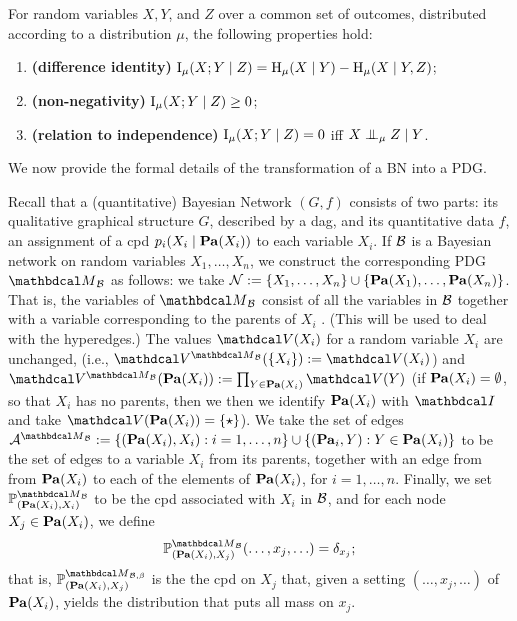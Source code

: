 \begin{subappendices}
\begin{fact}\label{fact:cmi}
For random variables $X,Y$, and $Z$ over a common set of outcomes,
distributed according to a distribution $\mu$,
the following properties hold:
\begin{enumerate}
    \item \textbf{(difference identity)} $\operatorname{\mathrm{I}}_\mu(X ; Y \mid Z) =
                  \operatorname{\mathrm{H}}_\mu(X \mid Y) - \operatorname{\mathrm{H}}_\mu(X \mid Y, Z)$; 
   \item \textbf{(non-negativity)} $\operatorname{\mathrm{I}}_\mu({ X }; { Y} \mid {Z}) \ge 0$;
    \item \textbf{(relation to independence)} $\operatorname{\mathrm{I}}_\mu({ X }; { Y}
         \mid { Z}) = 0$ iff $X \mathrel{\perp\mspace{-10mu}\perp}_\mu Z \mid Y$.
\end{enumerate}
\end{fact}

We now provide the formal details of
the transformation of a BN 
into
a PDG.

	\begin{defn}\label{def:bn2PDG}
Recall that a (quantitative) Bayesian Network $(G, f)$ consists of two
parts: its qualitative graphical structure $G$, 
described by a dag,
and its quantitative data $f$, an assignment of 
a cpd $p_i(X_i \mid \mathop{\mathbf{Pa}}(X_i))$ to each variable $X_i$.
If $\cal B$ is a Bayesian network on random variables
$X_1, \ldots, X_n$, we construct the corresponding PDG
$\PDGof{{\mathcal B}}$
			as follows: we take $\mathcal N := \{X_1, \ldots, X_n \} \cup
			\{ \mathop{\mathbf{Pa}}(X_1), \ldots, \mathop{\mathbf{Pa}}(X_n)\}$.  
That is, the variables of 
	  $\PDGof{{\mathcal B}}$
consist of all the variables in
${\cal B}$ together with a variable corresponding to the parents
of $X_i$%
.  (This will be used to deal with the hyperedges.) 
			The values $\V(X_i)$ for a random variable
			$X_i$ are unchanged, 
(i.e., $\V^{\PDGof{{\mathcal B}}}(\{X_i\}) := \V(X_i)$)
and $\V^{\PDGof{{\mathcal B}}}(\Pa(X_i)) := \prod_{Y \in \Pa(X_i)} \V(Y)$
(if $\mathop{\mathbf{Pa}}(X_i) = \emptyset$, so that $X_i$ has no parents, then we 
then we identify $\mathop{\mathbf{Pa}}(X_i)$ with $\pdgunit$ and
take $\V(\Pa(X_i)) = \{\star\}$). 
We take the set of edges $\Ar^{\PDGof{{\mathcal B}}} := \{ (\Pa(X_i), X_i) : 
i = 1, \ldots, n \} \cup \{ (\Pa_i, Y) : Y \in
			\Pa(X_i)\}$ to be the set of edges to a variable $X_i$
	  from its parents, together with an edge from
	  from $\mathop{\mathbf{Pa}}(X_i)$ to each of the elements of $\mathop{\mathbf{Pa}}(X_i)$, for
	  $i = 1, \ldots, n$.  
	Finally, we set $\mathbb P^{\PDGof{{\mathcal
				B}}}_{(\Pa(X_i), X_i)}$ to be the cpd associated
			with $X_i$ in $\cal B$, and for each node $X_j \in \mathop{\mathbf{Pa}}(X_i)$,
			we define
	\[ \mathbb P^{\PDGof{\mathcal B}}_{(\Pa(X_i),
			  X_j)}(\ldots, x_j, \ldots) = \delta_{x_j};\]
that is,
$\mathbb P_{(\Pa(X_i), X_j)}^{\PDGof{\mathcal B, \beta}}$ is the the cpd 
on $X_j$ that, given a setting $(\ldots, x_j, \ldots)$ of $\mathop{\mathbf{Pa}}(X_i)$, yields the distribution that puts all mass on $x_j$. 
\end{defn}




\end{subappendices}
